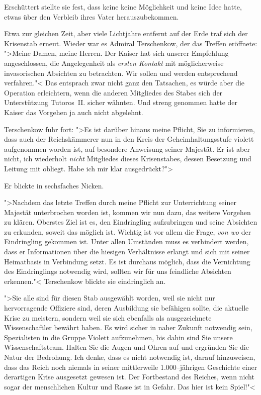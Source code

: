 Erschüttert stellte sie fest, dass keine keine Möglichkeit und keine Idee hatte, etwas über den Verbleib ihres Vater herauszubekommen.

\mbox{}

Etwa zur gleichen Zeit, aber viele Lichtjahre entfernt auf der Erde traf sich der Krisenstab erneut. Wieder war es Admiral Terschenkow, der das Treffen eröffnete: ">Meine Damen, meine Herren. Der Kaiser hat sich unserer Empfehlung angeschlossen, die Angelegenheit als \emph{ersten Kontakt} mit möglicherweise invasorischen Absichten zu betrachten. Wir sollen und werden entsprechend verfahren."< Das entsprach zwar nicht ganz den Tatsachen, es würde aber die Operation erleichtern, wenn die anderen Mitgliedes des Stabes sich der Unterstützung Tutoros~II. sicher wähnten. Und streng genommen hatte der Kaiser das Vorgehen ja auch nicht abgelehnt.

Terschenkow fuhr fort: ">Es ist darüber hinaus meine Pflicht, Sie zu informieren, dass auch der Reichskämmerer nun in den Kreis der Geheimhaltungsstufe violett aufgenommen worden ist, auf besondere Anweisung seiner Majestät. Er ist aber nicht, ich wiederholt \emph{nicht} Mitgliedes dieses Krisenstabes, dessen Besetzung und Leitung mit obliegt. Habe ich mir klar ausgedrückt?">

Er blickte in sechsfaches Nicken.

">Nachdem das letzte Treffen durch meine Pflicht zur Unterrichtung seiner Majestät unterbrochen worden ist, kommen wir nun dazu, das weitere Vorgehen zu klären. Oberstes Ziel ist es, den Eindringling aufzubringen und seine Absichten zu erkunden, soweit das möglich ist. Wichtig ist vor allem die Frage, \emph{von wo} der Eindringling gekommen ist. Unter allen Umständen muss es verhindert werden, dass er Informationen über die hiesigen Verhältnisse erlangt und sich mit seiner Heimatbasis in Verbindung setzt. Es ist durchaus möglich, dass die Vernichtung des Eindringlings notwendig wird, sollten wir für uns feindliche Absichten erkennen."< Terschenkow blickte sie eindringlich an.

">Sie alle sind für diesen Stab ausgewählt worden, weil sie nicht nur hervorragende Offiziere sind, deren Ausbildung sie befähigen sollte, die aktuelle Krise zu meistern, sondern weil sie sich ebenfalls als ausgezeichnete Wissenschaftler bewährt haben. Es wird sicher in naher Zukunft notwendig sein, Spezialisten in die Gruppe Violett aufzunehmen, bis dahin sind Sie unsere Wissenschaftsteam. Halten Sie die Augen und Ohren auf und ergründen Sie die Natur der Bedrohung. Ich denke, dass es nicht notwendig ist, darauf hinzuweisen, dass das Reich noch niemals in seiner mittlerweile 1.000--jährigen Geschichte einer derartigen Krise ausgesetzt gewesen ist. Der Fortbestand des Reiches, wenn nicht sogar der menschlichen Kultur und Rasse ist in Gefahr. Das hier ist kein Spiel!"<

